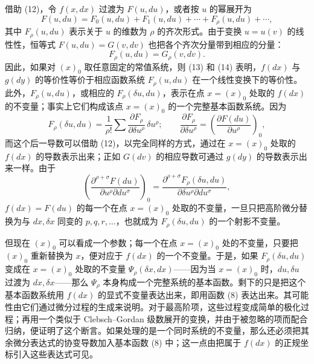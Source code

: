 借助 (12)，令 \(f(x,dx)\) 过渡为 \(F(u,du)\)，或者按 \(u\) 的幂展开为
\begin{equation}
F(u,du)=F_0(u,du)+F_1(u,du)+\cdots+F_\rho(u,du)+\cdots ,
\tag{13}
\end{equation}
其中 \(F_\rho(u,du)\) 表示关于 \(u\) 的维数为 \(\rho\) 的齐次形式。由于变换 \(u=u(v)\) 的线性性，恒等式 \(F(u,du)=G(v,dv)\) 也把各个齐次分量带到相应的分量：
\begin{equation}
F_\rho(u,du)=G_\rho(v,dv).
\tag{14}
\end{equation}
因此，如果对 \((x)_0\) 取任意固定的常值系统，则 (13) 和 (14) 表明，\(f(dx)\) 与 \(g(dy)\) 的等价性等价于相应函数系统 \(F_\rho(u,du)\) 在一个线性变换下的等价性。此外，\(F_\rho(u,du)\)，或相应的 \(F_\rho(\delta u,du)\)，表示在点 \(x=(x)_0\) 处取的 \(f(dx)\) 的不变量；事实上它们构成该点 \(x=(x)_0\) 的一个完整基本函数系统。因为
\[
F_\rho(\delta u,du)=\frac1{\rho!}\sum
\frac{\partial F_\rho}{\partial \delta u^\rho}\,\delta u^\rho;
\qquad
\frac{\partial F_\rho}{\partial \delta u^\rho}
=\left(\frac{\partial F(du)}{\partial u^\rho}\right)_0,
\]
而这个后一导数可以借助 (12)，以完全同样的方式，通过在 \(x=(x)_0\) 处取的 \(f(dx)\) 的导数表示出来；正如 \(G(dv)\) 的相应导数可通过 \(g(dy)\) 的导数表示出来一样。由于
\[
\left(\frac{\partial^{\rho+\sigma}F(du)}
{\partial u^\rho\partial du^\sigma}\right)_0
=
\frac{\partial^{\rho+\sigma}F_\rho(\delta u,du)}
{\partial\delta u^\rho\partial du^\sigma},
\]
\(f(dx)=F(du)\) 的每一个在点 \(x=(x)_0\) 处取的不变量，一旦只把高阶微分替换为与 \(dx,\delta x\) 同变的 \(p,q,r,\ldots\)，也就成为 \(F_\rho(\delta u,du)\) 的一个射影不变量。

但现在 \((x)_0\) 可以看成一个参数；每一个在点 \(x=(x)_0\) 处的不变量，只要把 \((x)_0\) 重新替换为 \(x\)，便对应于 \(f(dx)\) 的一个不变量。于是，如果 \(F_\rho(\delta u,du)\) 变成在 \(x=(x)_0\) 处取的不变量 \(\Psi_\rho(\delta x,dx)\)——因为当 \(x=(x)_0\) 时，\(du,\delta u\) 过渡为 \(dx,\delta x\)——那么 \(\Psi_\rho\) 本身构成一个完整系统的基本函数。剩下的只是把这个基本函数系统用 \(f(dx)\) 的显式不变量表达出来，即用函数 (8) 表达出来。其可能性由它们通过微分过程的生成来说明。对于最高阶项，这些过程变成简单的极化过程；再用一个类似于 Clebsch--Gordan 级数展开的变换，并由于被忽略的项而配合归纳，便证明了这个断言。如果处理的是一个同时系统的不变量，那么还必须把其余微分表达式的协变导数加入基本函数 (8) 中；这一点由把属于 \(f(dx)\) 的正规坐标引入这些表达式可见。

